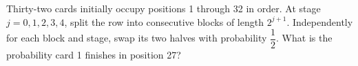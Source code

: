 Thirty-two cards initially occupy positions 1 through 32 in order. At stage $j=0,1,2,3,4$, split the row into consecutive blocks of length $2^{j+1}$. Independently for each block and stage, swap its two halves with probability $\dfrac{1}{2}$. What is the probability card 1 finishes in position 27?
